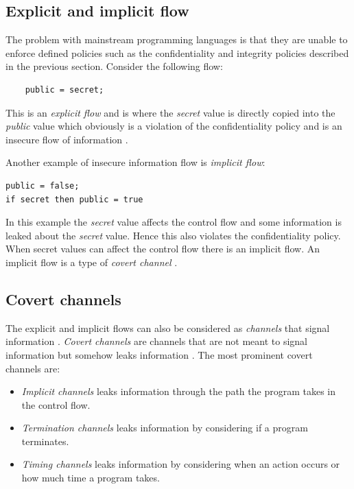 \subsection{Explicit and implicit flow}
The problem with mainstream programming languages is that they are unable to enforce defined policies such as the confidentiality and integrity policies described in the previous section. Consider the following flow:

\begin{lstlisting}
	public = secret;
\end{lstlisting}

This is an \emph{explicit flow} and is where the \emph{secret} value is directly copied into the \emph{public} value which obviously is a violation of the confidentiality policy and is an insecure flow of information \cite{Hedin2011}. 

Another example of insecure information flow is \emph{implicit flow}:

\begin{lstlisting}[language=ALGOL]
public = false;
if secret then public = true
\end{lstlisting}

In this example the \emph{secret} value affects the control flow and some information is leaked about the \emph{secret} value. Hence this also violates the confidentiality policy. When secret values can affect the control flow there is an implicit flow. An implicit flow is a type of \emph{covert channel} \cite{Sabelfeld2003}.

\subsection{Covert channels} The explicit and implicit flows can also be considered as \emph{channels} that signal information \cite{Kashyap2011} \cite{Sabelfeld2003}. \emph{Covert channels} are channels that are not meant to signal information but somehow leaks information \cite{Kashyap2011}. The most prominent covert channels are: 
\begin{itemize}
	\item \emph{Implicit channels} leaks information through the path the program takes in the control flow.
	\item \emph{Termination channels} leaks information by considering if a program terminates.
	\item \emph{Timing channels} leaks information by considering when an action occurs or how much time a program takes.
\end{itemize}

